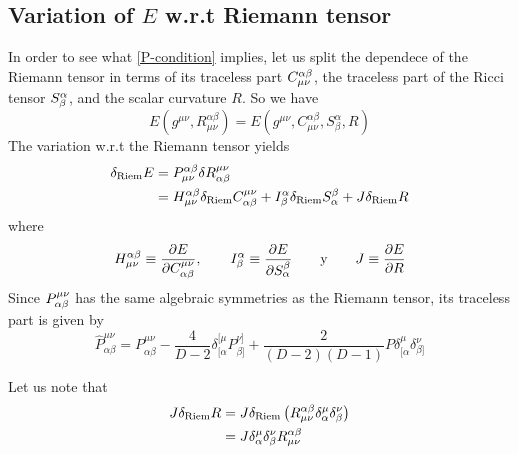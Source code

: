 \subsection{Variation of $E$ w.r.t Riemann tensor}
In order to see what \eqref{P-condition} implies, let us split the dependece of the Riemann tensor in terms of its traceless part $C_{\mu\nu }^{\alpha\beta }$, the traceless part of the Ricci tensor $S^\alpha_\beta $, and the scalar curvature $R$. So we have
\begin{equation*}
    E\left(g^{\mu\nu},R^{\alpha\beta}_{\mu\nu}\right)=E\left(g^{\mu\nu},C^{\alpha\beta}_{\mu\nu},S^\alpha_\beta,R\right)
\end{equation*}
The variation w.r.t the Riemann tensor yields
\begin{align}
    \nonumber\delta_{\rm Riem}E&=P^{\alpha\beta}_{\mu\nu}\delta R^{\mu\nu}_{\alpha\beta}\\
    &=H^{\alpha\beta}_{\mu\nu}\delta_{\rm Riem}C^{\mu\nu}_{\alpha\beta}+I^\alpha_\beta\delta_{\rm Riem}S^\beta_\alpha+J\delta_{\rm Riem}R\label{var R}
\end{align}
where
\begin{equation*}
    H^{\alpha\beta}_{\mu\nu}\equiv\pdv{E}{C^{\mu\nu}_{\alpha\beta}},\qquad I^\alpha_\beta\equiv \pdv{E}{S^\beta_\alpha}\qquad \text{y} \qquad  J\equiv\pdv{E}{R}
\end{equation*}
Since $P_{\alpha\beta }^{\mu\nu }$ has the same algebraic symmetries as the Riemann tensor, its traceless part is given by
\begin{equation}
    \hat{P}^{\mu\nu}_{\alpha\beta}=P^{\mu\nu}_{\alpha\beta}-\frac{4}{D-2}\delta^{[\mu}_{[\alpha}P^{\nu]}_{\beta]}+\frac{2}{(D-2)(D-1)}P\delta^\mu_{[\alpha}\delta^\nu_{\beta]}
\end{equation}




Let us note that
\begin{align}
   \nonumber J\delta_{\rm Riem}R&=J\delta_{\rm Riem}\left(R^{\alpha\beta}_{\mu\nu}\delta^\mu_\alpha\delta^\nu_\beta\right)\\
    &=J\delta^\mu_\alpha\delta^\nu_\beta R^{\alpha\beta}_{\mu\nu}\label{delta R}
\end{align}


